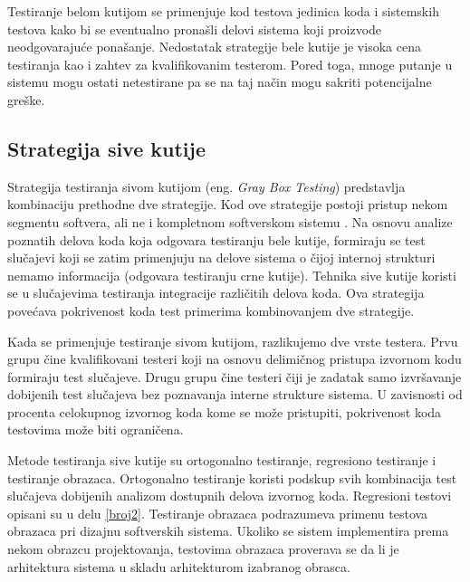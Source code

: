 \documentclass[12pt,oneside]{memoir}
\begin{document}
Testiranje belom kutijom se primenjuje kod testova jedinica koda i sistemskih testova kako bi se eventualno pronašli delovi sistema koji proizvode neodgovarajuće ponašanje.
Nedostatak strategije bele kutije je visoka cena testiranja kao i zahtev za kvalifikovanim testerom. Pored toga,
mnoge putanje u sistemu mogu ostati netestirane pa se na taj način mogu sakriti potencijalne greške. 

\subsection{Strategija sive kutije}

Strategija testiranja sivom kutijom (eng. \textit{Gray Box Testing}) predstavlja kombinaciju prethodne dve strategije. Kod ove strategije postoji pristup nekom segmentu softvera, ali ne i kompletnom softverskom sistemu \cite{GrayBoxTesting}. Na osnovu analize poznatih delova koda koja odgovara testiranju bele kutije, formiraju se test slučajevi koji se zatim primenjuju na delove sistema o čijoj internoj strukturi nemamo informacija (odgovara testiranju crne kutije). Tehnika sive kutije koristi se u slučajevima testiranja integracije različitih delova koda. Ova strategija povećava pokrivenost koda test primerima kombinovanjem dve strategije. 
\par
Kada se primenjuje testiranje sivom kutijom, razlikujemo dve vrste testera. Prvu grupu čine kvalifikovani testeri koji na osnovu delimičnog pristupa izvornom kodu formiraju test slučajeve. Drugu grupu čine testeri čiji je zadatak samo izvršavanje dobijenih test slučajeva bez poznavanja interne strukture sistema. 
U zavisnosti od procenta celokupnog izvornog koda kome se može pristupiti, pokrivenost koda testovima može biti ograničena. 
\par
Metode testiranja sive kutije su ortogonalno testiranje, regresiono testiranje i testiranje obrazaca.
Ortogonalno testiranje koristi podskup svih kombinacija test slučajeva  dobijenih analizom dostupnih delova izvornog koda.
Regresioni testovi opisani su u delu \ref{broj2}. Testiranje obrazaca podrazumeva primenu testova obrazaca pri dizajnu softverskih sistema.
Ukoliko se sistem implementira prema nekom obrazcu projektovanja, testovima obrazaca proverava se da li je arhitektura sistema u skladu arhitekturom izabranog obrasca.
\end{document}
